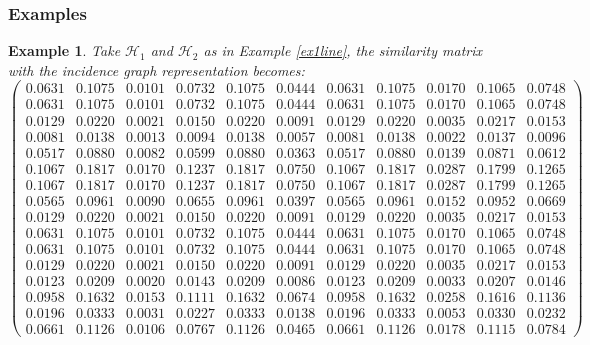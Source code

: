 \documentclass[a4paper,11pt]{report}
\newtheorem{example}[theorem]{Example}
\newcommand{\hgrafeen}{\mathcal{H}}
\begin{document}
\subsubsection{Examples}
\begin{example}\label{igex1}
Take $\hgrafeen_1$ and $\hgrafeen_2$ as in Example \ref{ex1line}, the similarity 
matrix with the incidence graph representation becomes:
$$\left(\begin{array}{llllllll|lll}
 0.0631&0.1075&0.0101&0.0732&0.1075&0.0444&0.0631&0.1075&0.0170&0.1065&0.0748\\
0.0631&0.1075&0.0101&0.0732&0.1075&0.0444&0.0631&0.1075&0.0170&0.1065&0.0748\\
0.0129&0.0220&0.0021&0.0150&0.0220&0.0091&0.0129&0.0220&0.0035&0.0217&0.0153\\
0.0081&0.0138&0.0013&0.0094&0.0138&0.0057&0.0081&0.0138&0.0022&0.0137&0.0096\\
0.0517&0.0880&0.0082&0.0599&0.0880&0.0363&0.0517&0.0880&0.0139&0.0871&0.0612\\
0.1067&0.1817&0.0170&0.1237&0.1817&0.0750&0.1067&0.1817&0.0287&0.1799&0.1265\\
0.1067&0.1817&0.0170&0.1237&0.1817&0.0750&0.1067&0.1817&0.0287&0.1799&0.1265\\
0.0565&0.0961&0.0090&0.0655&0.0961&0.0397&0.0565&0.0961&0.0152&0.0952&0.0669\\
0.0129&0.0220&0.0021&0.0150&0.0220&0.0091&0.0129&0.0220&0.0035&0.0217&0.0153\\
0.0631&0.1075&0.0101&0.0732&0.1075&0.0444&0.0631&0.1075&0.0170&0.1065&0.0748\\
0.0631&0.1075&0.0101&0.0732&0.1075&0.0444&0.0631&0.1075&0.0170&0.1065&0.0748\\
0.0129&0.0220&0.0021&0.0150&0.0220&0.0091&0.0129&0.0220&0.0035&0.0217&0.0153\\ 
\hline
0.0123&0.0209&0.0020&0.0143&0.0209&0.0086&0.0123&0.0209&0.0033&0.0207&0.0146\\
0.0958&0.1632&0.0153&0.1111&0.1632&0.0674&0.0958&0.1632&0.0258&0.1616&0.1136\\
0.0196&0.0333&0.0031&0.0227&0.0333&0.0138&0.0196&0.0333&0.0053&0.0330&0.0232\\
0.0661&0.1126&0.0106&0.0767&0.1126&0.0465&0.0661&0.1126&0.0178&0.1115&0.0784
\end{array}\right)$$
\end{example}
\end{document}
